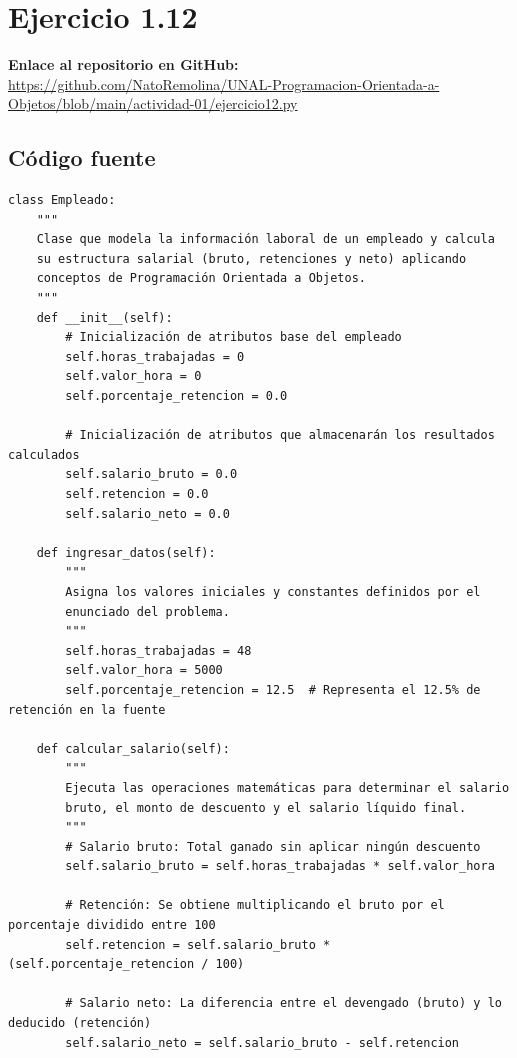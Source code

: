 \documentclass[11pt, a4paper]{article}
\begin{document}
\newpage
\section{Ejercicio 1.12}

\noindent \textbf{Enlace al repositorio en GitHub:} \\
\url{https://github.com/NatoRemolina/UNAL-Programacion-Orientada-a-Objetos/blob/main/actividad-01/ejercicio12.py}

\subsection{Código fuente}
\begin{lstlisting}
class Empleado:
    """
    Clase que modela la información laboral de un empleado y calcula 
    su estructura salarial (bruto, retenciones y neto) aplicando
    conceptos de Programación Orientada a Objetos.
    """
    def __init__(self):
        # Inicialización de atributos base del empleado
        self.horas_trabajadas = 0
        self.valor_hora = 0
        self.porcentaje_retencion = 0.0
        
        # Inicialización de atributos que almacenarán los resultados calculados
        self.salario_bruto = 0.0
        self.retencion = 0.0
        self.salario_neto = 0.0

    def ingresar_datos(self):
        """
        Asigna los valores iniciales y constantes definidos por el 
        enunciado del problema.
        """
        self.horas_trabajadas = 48
        self.valor_hora = 5000
        self.porcentaje_retencion = 12.5  # Representa el 12.5% de retención en la fuente

    def calcular_salario(self):
        """
        Ejecuta las operaciones matemáticas para determinar el salario 
        bruto, el monto de descuento y el salario líquido final.
        """
        # Salario bruto: Total ganado sin aplicar ningún descuento
        self.salario_bruto = self.horas_trabajadas * self.valor_hora
        
        # Retención: Se obtiene multiplicando el bruto por el porcentaje dividido entre 100
        self.retencion = self.salario_bruto * (self.porcentaje_retencion / 100)
        
        # Salario neto: La diferencia entre el devengado (bruto) y lo deducido (retención)
        self.salario_neto = self.salario_bruto - self.retencion


\end{lstlisting}
\end{document}
